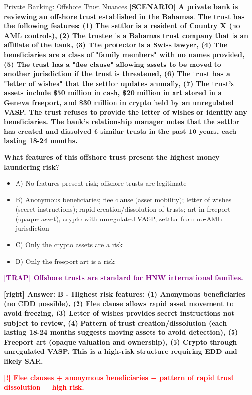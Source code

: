\documentclass[11pt,a4paper]{beamer}
\newcommand{\redflag}[1]{\textcolor{red}{\textbf{[!] #1}}}
\newcommand{\trap}[1]{\textcolor{purple}{\textbf{[TRAP] #1}}}
\newcommand{\correct}[1]{\textcolor{green!50!black}{\textbf{[right] #1}}}
\newcommand{\scenario}[1]{\textcolor{blue!70!black}{\textbf{[SCENARIO] #1}}}
\begin{document}
	
	\begin{frame}{Private Banking: Offshore Trust Nuances}
		\tiny
		\scenario{A private bank is reviewing an offshore trust established in the Bahamas. The trust has the following features: (1) The settlor is a resident of Country X (no AML controls), (2) The trustee is a Bahamas trust company that is an affiliate of the bank, (3) The protector is a Swiss lawyer, (4) The beneficiaries are a class of "family members" with no names provided, (5) The trust has a "flee clause" allowing assets to be moved to another jurisdiction if the trust is threatened, (6) The trust has a "letter of wishes" that the settlor updates annually, (7) The trust's assets include \$50 million in cash, \$20 million in art stored in a Geneva freeport, and \$30 million in crypto held by an unregulated VASP. The trust refuses to provide the letter of wishes or identify any beneficiaries. The bank's relationship manager notes that the settlor has created and dissolved 6 similar trusts in the past 10 years, each lasting 18-24 months.}
		
		\vspace{0.02cm}
		\textbf{What features of this offshore trust present the highest money laundering risk?}
		\vspace{0.02cm}
		
		\begin{itemize}
			\item A) No features present risk; offshore trusts are legitimate
			\item B) Anonymous beneficiaries; flee clause (asset mobility); letter of wishes (secret instructions); rapid creation/dissolution of trusts; art in freeport (opaque asset); crypto with unregulated VASP; settlor from no-AML jurisdiction
			\item C) Only the crypto assets are a risk
			\item D) Only the freeport art is a risk
		\end{itemize}
		
		\vspace{0.02cm}
		\trap{Offshore trusts are standard for HNW international families.}
		
		\vspace{0.02cm}
		\correct{Answer: B - Highest risk features: (1) Anonymous beneficiaries (no CDD possible), (2) Flee clause allows rapid asset movement to avoid freezing, (3) Letter of wishes provides secret instructions not subject to review, (4) Pattern of trust creation/dissolution (each lasting 18-24 months suggests moving assets to avoid detection), (5) Freeport art (opaque valuation and ownership), (6) Crypto through unregulated VASP. This is a high-risk structure requiring EDD and likely SAR.}
		
		\vspace{0.02cm}
		\redflag{Flee clauses + anonymous beneficiaries + pattern of rapid trust dissolution = high risk.}
	\end{frame}
	
\end{document}
